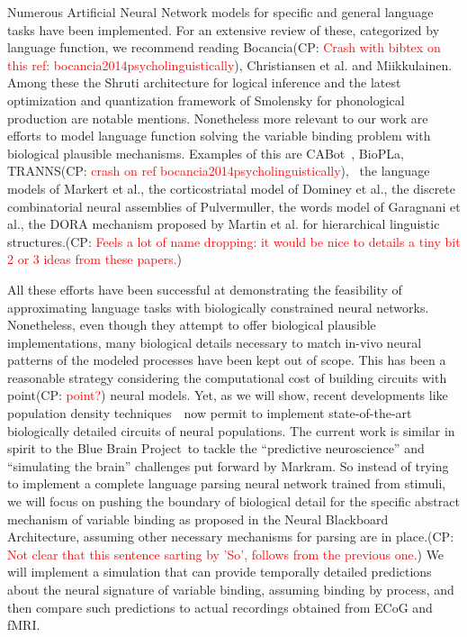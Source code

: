 \documentclass[10pt]{article}
\newcommand{\noteCP}[1]{(CP: \textcolor{red}{#1})}
\begin{document}
Numerous Artificial Neural Network models for specific and general
language tasks have been implemented. For an extensive review of
these, categorized by language function, we recommend reading
Bocancia\noteCP{Crash with bibtex on this ref:
  bocancia2014psycholinguistically}, Christiansen et
al.\cite{Christiansen_1999} and
Miikkulainen\cite{miikkulainen1997natural}. Among these the Shruti
architecture for logical inference\cite{Wendelken_2004} and the latest
optimization and quantization framework of Smolensky for phonological
production\cite{Smolensky_2013} are notable mentions. Nonetheless more
relevant to our work are efforts to model language function solving
the variable binding problem with biological plausible mechanisms.
Examples of this are CABot~\cite{Huyck_2009},
BioPLa\cite{Garcia_Rosa},
TRANNS\noteCP{crash on ref {bocancia2014psycholinguistically}}, ~the language models of
Markert et al.\cite{Markert_2007}, the corticostriatal model of
Dominey et al.\cite{Dominey_2009}, the discrete combinatorial neural
assemblies of Pulvermuller\cite{Pulverm_ller_2009,Pulverm_ller_2010},
the words model of Garagnani et al.\cite{Garagnani_2017}, the DORA
mechanism proposed by Martin et al. for hierarchical linguistic
structures\cite{Martin_2017}.\noteCP{Feels a lot of name dropping: it
  would be nice to details a tiny bit 2 or 3 ideas from these papers.}

All these efforts have been successful at demonstrating the
feasibility of approximating language tasks with biologically
constrained neural networks. Nonetheless, even though they attempt to
offer biological plausible implementations, many biological details
necessary to match in-vivo neural patterns of the modeled processes
have been kept out of scope. This has been a reasonable strategy
considering the computational cost of building circuits with
point\noteCP{point?} neural models. Yet, as we will show, recent
developments like population density
techniques~\cite{de2013generica}~now permit to implement
state-of-the-art biologically detailed circuits of neural populations.
The current work is similar in spirit to the Blue Brain
Project\cite{Markram_2006}~to tackle the ``predictive neuroscience''
and ``simulating the brain'' challenges put forward by
Markram\cite{markram2013seven}. So instead of trying to implement a
complete language parsing neural network trained from stimuli, we will
focus on pushing the boundary of biological detail for the specific
abstract mechanism of variable binding as proposed in the Neural
Blackboard Architecture\cite{van_der_Velde_2006}, assuming other
necessary mechanisms for parsing are in place.\noteCP{Not clear that
  this sentence sarting by 'So', follows from the previous one.} We
will implement a simulation that can provide temporally detailed
predictions about the neural signature of variable binding, assuming
binding by process, and then compare such predictions to actual
recordings obtained from ECoG and fMRI.
\end{document}
